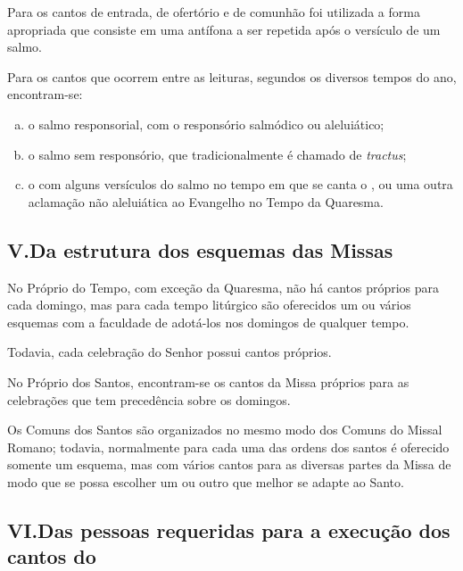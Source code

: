  Para os cantos de entrada, de ofertório e de comunhão foi utilizada a forma apropriada que consiste em uma antífona a ser repetida após o versículo de um salmo.

 Para os cantos que ocorrem entre as leituras, segundos os diversos tempos do ano, encontram-se:
\begin{enumerate}[a)]
  \item o salmo responsorial, com o responsório salmódico ou aleluiático;

  \item o salmo sem responsório, que tradicionalmente é chamado de \emph{tractus};

  \item o {\Al} com alguns versículos do salmo no tempo em que se canta o \textcolor{gregoriocolor}{\Al}, ou uma outra aclamação não aleluiática ao Evangelho no Tempo da Quaresma.
\end{enumerate}

\subsection{V.\@ Da estrutura dos esquemas das Missas}\label{subsection:praenotanda-5}

 No Próprio do Tempo, com exceção da Quaresma, não há cantos próprios para cada domingo, mas para cada tempo litúrgico são oferecidos um ou vários esquemas com a faculdade de adotá-los nos domingos de qualquer tempo.

Todavia, cada celebração do Senhor possui cantos próprios.

 No Próprio dos Santos, encontram-se os cantos da Missa próprios para as celebrações que tem precedência sobre os domingos.

 Os Comuns dos Santos são organizados no mesmo modo dos Comuns do Missal Romano; todavia, normalmente para cada uma das ordens dos santos é oferecido somente um esquema, mas com vários cantos para as diversas partes da Missa de modo que se possa escolher um ou outro que melhor se adapte ao Santo.

\subsection{VI.\@ Das pessoas requeridas para a execução dos cantos do {\GS}}

